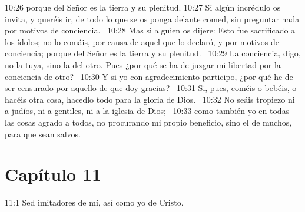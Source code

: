 10:26 porque del Señor es la tierra y su plenitud. 
10:27 Si algún incrédulo os invita, y queréis ir, de todo lo que se os ponga delante comed, sin preguntar nada por motivos de conciencia.  
10:28 Mas si alguien os dijere: Esto fue sacrificado a los ídolos; no lo comáis, por causa de aquel que lo declaró, y por motivos de conciencia; porque del Señor es la tierra y su plenitud.  
10:29 La conciencia, digo, no la tuya, sino la del otro. Pues ¿por qué se ha de juzgar mi libertad por la conciencia de otro?  
10:30 Y si yo con agradecimiento participo, ¿por qué he de ser censurado por aquello de que doy gracias?  
10:31 Si, pues, coméis o bebéis, o hacéis otra cosa, hacedlo todo para la gloria de Dios.  
10:32 No seáis tropiezo ni a judíos, ni a gentiles, ni a la iglesia de Dios;  
10:33 como también yo en todas las cosas agrado a todos, no procurando mi propio beneficio, sino el de muchos, para que sean salvos. 
\section*{Capítulo 11}
11:1 Sed imitadores de mí, así como yo de Cristo.  


